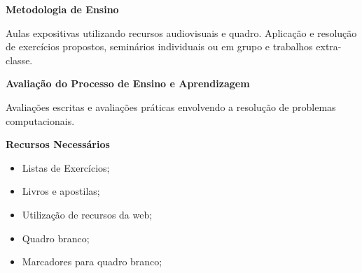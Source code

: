  
 

\begin{snugshade}\begin{center}\textbf{
    Metodologia de Ensino
}\end{center}\end{snugshade}

\noindent
   Aulas expositivas utilizando recursos audiovisuais e quadro. Aplicação e resolução de exercícios propostos, seminários individuais ou em grupo e trabalhos extra-classe.

\begin{snugshade}\begin{center}\textbf{
    Avaliação do Processo de Ensino e Aprendizagem
}\end{center}\end{snugshade}

\noindent
   Avaliações escritas e avaliações práticas envolvendo a resolução de problemas computacionais.
   
\begin{snugshade}\begin{center}\textbf{
    Recursos Necessários
    \vphantom{q} %
}\end{center}\end{snugshade}

\begin{itemize} 
  \item Listas de Exercícios;
  \item Livros e apostilas;
  \item Utilização de recursos da web;
  \item Quadro branco;
  \item Marcadores para quadro branco;
\end{itemize}

